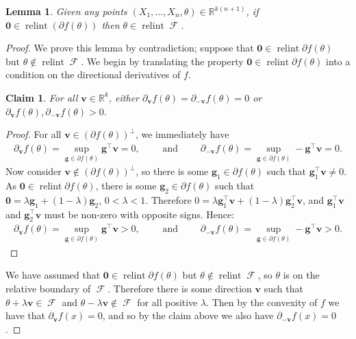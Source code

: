 \documentclass[10pt]{article}
\newtheorem{lemma}[theorem]{Lemma}
\newtheorem*{claim*}{Claim}
\theoremstyle{definition}
\theoremstyle{remark}
\newcommand{\R}{\mathbb{R}}
\newcommand{\T}{\intercal}
\newcommand{\sample}{ X_1,\dots, X_n}
\DeclareMathOperator{\relint}{relint}
\DeclareMathOperator{\FMset}{\mathcal{F}}
\renewcommand{\vec}[1]{\mathbf{#1}}
\begin{document}
	\begin{lemma}\label{lemma:RelintGrad_to_RelintFMset}
		Given any points  $(\sample, \theta) \in \R^{k(n+1)}$, if 
		$\vec 0 \in \relint(\partial f(\theta))$ then $\theta \in \relint \FMset$.
	\end{lemma}
	
	\begin{proof}
		We prove this lemma by contradiction; suppose that $\vec 0 \in \relint\partial f(\theta)$ but $\theta \notin \relint \FMset$. We begin by translating the property $\vec 0 \in \relint \partial f(\theta)$ into a condition on the directional derivatives of $f$.
		\begin{claim*}
			For all $\vec v \in \R^k$, either $\partial_{\vec v} f(\theta) = \partial_{- \vec v} f(\theta) = 0$ or $\partial_{\vec v} f(\theta), \partial_{-\vec v} f(\theta) > 0$.
		\end{claim*}
		\begin{proof}
			For all $\vec v \in (\partial f(\theta))^{\perp}$, we immediately have
			\begin{align*}
				\partial_{\vec v} f(\theta) = \sup_{\vec g \in \partial f(\theta)} \vec g^{\T}\vec v = 0, \qquad 
				\text{ and } \qquad \partial_{-\vec v} f(\theta) = \sup_{\vec g \in \partial f(\theta)} -\vec g^{\T}\vec v = 0.
			\end{align*}
			Now consider $\vec v \notin (\partial f(\theta))^{\perp}$, so there is some $\vec g_1 \in \partial f(\theta)$ such that $\vec g_1^{\T}\vec v \neq 0$. As $\vec 0 \in \relint\partial f(\theta)$, there is some $\vec g_2 \in \partial f(\theta)$ such that $\vec 0 = \lambda \vec g_1 + (1-\lambda) \vec g_2$, $0 < \lambda < 1$. Therefore $0=\lambda \vec g_1^{\T}\vec v + (1-\lambda) \vec g_2^{\T} \vec v$, and $\vec g_1^{\T}\vec v$ and $\vec g_2^{\T}\vec v$ must be non-zero with opposite signs. Hence:
			\begin{align*}
				\partial_{\vec v} f(\theta) = \sup_{\vec g \in \partial f(\theta)} \vec g^{\T}\vec v > 0, \qquad
				\text{ and } \qquad \partial_{-\vec v} f(\theta) = \sup_{\vec g \in \partial f(\theta)} -\vec g^{\T}\vec v > 0.
			\end{align*}
		\end{proof}    
		We have assumed that $\vec 0 \in \relint\partial f(\theta)$ but $\theta \notin \relint \FMset$, so $\theta$ is on the relative boundary of $\FMset$. Therefore there is some direction $\vec v$ such that $\theta + \lambda \vec v \in \FMset$ and $\theta - \lambda\vec v \notin \FMset$ for all positive $\lambda$. Then by the convexity of $f$ we have that $\partial_{\vec v} f(x) = 0$, and so by the claim above we also have $\partial_{-\vec v} f(x) = 0$.
		

\end{proof}
\end{document}
